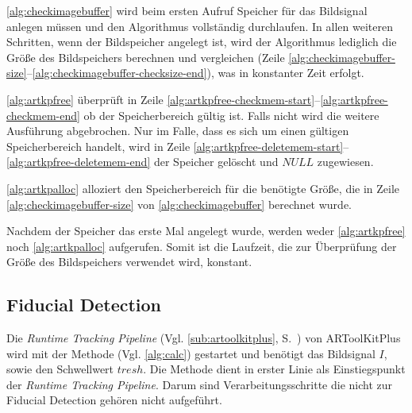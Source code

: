 

\autoref{alg:checkimagebuffer} wird beim ersten Aufruf Speicher für das Bildsignal anlegen müssen und den Algorithmus
 vollständig durchlaufen. In allen weiteren Schritten, wenn der Bildspeicher angelegt ist, wird der Algorithmus
 lediglich die Größe des Bildspeichers berechnen und vergleichen
 (Zeile \ref{alg:checkimagebuffer-size}--\ref{alg:checkimagebuffer-checksize-end}), was in konstanter Zeit erfolgt.

\autoref{alg:artkpfree} überprüft in Zeile \ref{alg:artkpfree-checkmem-start}--\ref{alg:artkpfree-checkmem-end} ob der
 Speicherbereich gültig ist. Falls nicht wird die weitere Ausführung abgebrochen. Nur im Falle, dass es sich um einen
 gültigen Speicherbereich handelt, wird in Zeile \ref{alg:artkpfree-deletemem-start}--\ref{alg:artkpfree-deletemem-end}
 der Speicher gelöscht und $\mathit{NULL}$ zugewiesen.



\autoref{alg:artkpalloc} alloziert den Speicherbereich für die benötigte Größe, die in Zeile
 \ref{alg:checkimagebuffer-size} von \autoref{alg:checkimagebuffer} berechnet wurde.



Nachdem der Speicher das erste Mal angelegt wurde, werden weder \autoref{alg:artkpfree} noch \autoref{alg:artkpalloc}
 aufgerufen. Somit ist die Laufzeit, die zur Überprüfung der Größe des Bildspeichers verwendet wird, konstant.



\subsection{Fiducial Detection} %
\label{sec:fiducial_detection}

Die \textit{Runtime Tracking Pipeline} (Vgl. \autoref{sub:artoolkitplus}, S.~\pageref{sub:artoolkitplus}) von
 ARToolKitPlus wird mit der Methode  (Vgl. \autoref{alg:calc}) gestartet und benötigt das Bildsignal
 $I$, sowie den Schwellwert $\mathit{tresh}$. Die Methode  dient in erster Linie als Einstiegspunkt der
 \textit{Runtime Tracking Pipeline}. Darum sind Verarbeitungsschritte die nicht zur Fiducial Detection gehören nicht
 aufgeführt.



